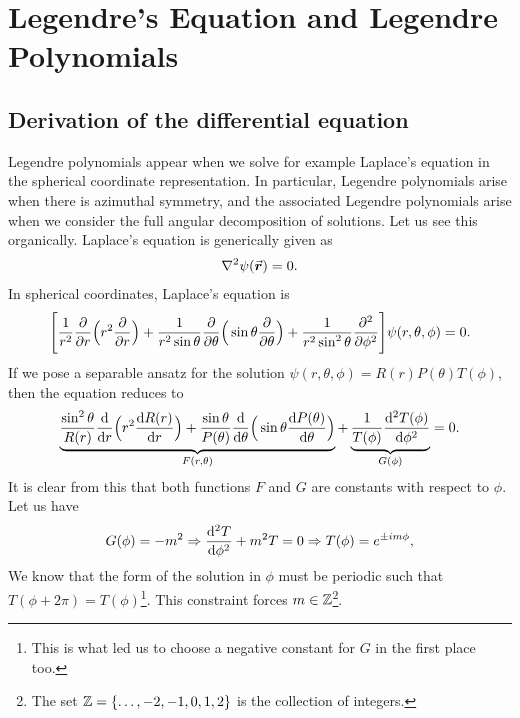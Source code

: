 \chapter{Legendre's Equation and Legendre Polynomials}


\section{Derivation of the differential equation}

Legendre polynomials appear when we solve for example Laplace's equation in the spherical coordinate representation.
In particular, Legendre polynomials arise when there is azimuthal symmetry, and the associated Legendre polynomials arise when we consider the full angular decomposition of solutions.
Let us see this organically.
Laplace's equation is generically given as
\begin{eqnarray}
    \laplacian \psi(\va*{r}) = 0
.\end{eqnarray}
In spherical coordinates, Laplace's equation is
\begin{eqnarray}
    \Bigg[ \frac{1}{r^2} \pdv{r} \Big( r^2 \pdv{r} \Big) + \frac{1}{r^2 \sin{\theta}} \pdv{\theta} \Big( \sin{\theta} \pdv{\theta} \Big) + \frac{1}{r^2 \sin^2{\theta}} \pdv[2]{\phi} \Bigg] \psi(r,\theta,\phi) = 0
.\end{eqnarray}
If we pose a separable ansatz for the solution $\psi(r,\theta,\phi) = R(r) P(\theta) T(\phi)$, then the equation reduces to
\begin{align}
    \underbrace{ \frac{\sin^2{\theta}}{ R(r)} \dv{r} \Big( r^2 \dv{R(r)}{r} \Big) + \frac{\sin{\theta}}{P(\theta)} \dv{\theta} \Big( \sin{\theta} \dv{P(\theta)}{\theta} \Big) }_{F(r,\theta)} + \underbrace{ \frac{1}{T(\phi)} \dv[2]{T(\phi)}{\phi} }_{G(\phi)} = 0
.\end{align}
It is clear from this that both functions $F$ and $G$ are constants with respect to $\phi$.
Let us have 
\begin{align}
    G(\phi) = -m^2 \Rightarrow \dv[2]{T}{\phi} + m^2 T = 0 \Rightarrow T(\phi) = e^{\pm im\phi}
,\end{align}
We know that the form of the solution in $\phi$ must be periodic such that $T(\phi + 2\pi) = T(\phi)$\footnote{This is what led us to choose a negative constant for $G$ in the first place too.}.
This constraint forces $m \in \mathbb{Z}$\footnote{The set $\mathbb{Z} = \{ \ldots,-2,-1,0,1,2 \}$ is the collection of integers.}.

